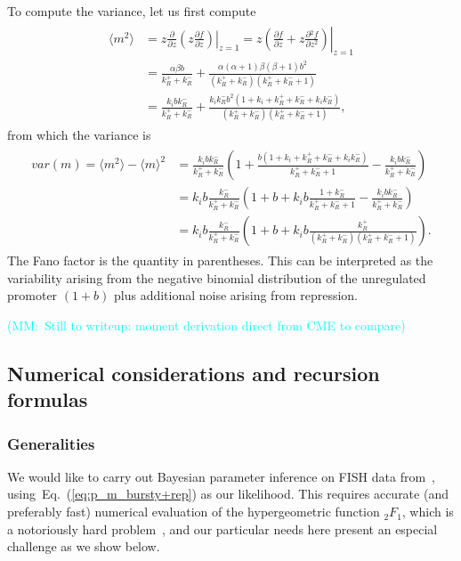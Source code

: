 \documentclass[12pt]{article}%
\newcommand{\mmnote}[1]{\textcolor{cyan}{(MM:~#1)}}
\newcommand{\pderiv}[2][{}]{\frac{\partial #1}{\partial #2}}
\newcommand{\psecderiv}[2][{}]{\frac{\partial{^2} #1}{\partial #2{^2}}}
\newcommand{\eq}[1]{Eq.~(\ref{#1})}
\begin{document}
To compute the variance, let us first compute
\begin{align}
\begin{split}
\langle m^2\rangle
&= \left .z\pderiv{z}\left(z\pderiv[f]{z}\right) \right|_{z=1}
= \left. z\left(\pderiv[f]{z} + z\psecderiv[f]{z}\right)\right|_{z=1}
\\
&= \frac{\alpha\beta b}{k_R^+ + k_R^-}
        + \frac{\alpha(\alpha+1)\beta(\beta+1) b^2}
                {(k_R^+ + k_R^-)(k_R^+ + k_R^- + 1)}
\\
&= \frac{k_i b k_R^-}{k_R^+ + k_R^-}
        + \frac{k_i k_R^- b^2 (1 + k_i + k_R^+ + k_R^- + k_i k_R^-)}
                {(k_R^+ + k_R^-)(k_R^+ + k_R^- + 1)},
\end{split}
\end{align}
from which the variance is
\begin{align}
\begin{split}
var(m) = \langle m^2\rangle - \langle m\rangle^2
&= \frac{k_i b k_R^-}{k_R^+ + k_R^-}
\left(
1 + \frac{b(1 + k_i + k_R^+ + k_R^- + k_i k_R^-)} {k_R^+ + k_R^- + 1}
- \frac{k_i b k_R^-}{k_R^+ + k_R^-}
\right)
\\
&= k_i b\frac{k_R^-}{k_R^+ + k_R^-}
\left(
1 + b + k_i b\frac{1 + k_R^-} {k_R^+ + k_R^- + 1}
- \frac{k_i b k_R^-}{k_R^+ + k_R^-}
\right)
\\
&= k_i b\frac{k_R^-}{k_R^+ + k_R^-}
\left(
1 + b + k_i b\frac{k_R^+}{(k_R^+ + k_R^-)(k_R^+ + k_R^- + 1)}
\right).
\end{split}
\end{align}
The Fano factor is the quantity in parentheses. This can be interpreted as
the variability arising from the negative binomial distribution of the
unregulated promoter $(1+b)$ plus additional noise arising from repression.

\mmnote{Still to writeup: moment derivation direct from CME to compare}

\subsection{Numerical considerations and recursion formulas}
\subsubsection{Generalities}
We would like to carry out Bayesian parameter inference on FISH data
from~\cite{Jones2014}, using~\eq{eq:p_m_bursty+rep} as our
likelihood. This requires accurate (and preferably fast)
numerical evaluation of the hypergeometric function ${_2F_1}$,
which is a notoriously hard problem~\cite{Pearson2017, Gil2007},
and our particular needs here present an especial challenge as we show below.
\end{document}
